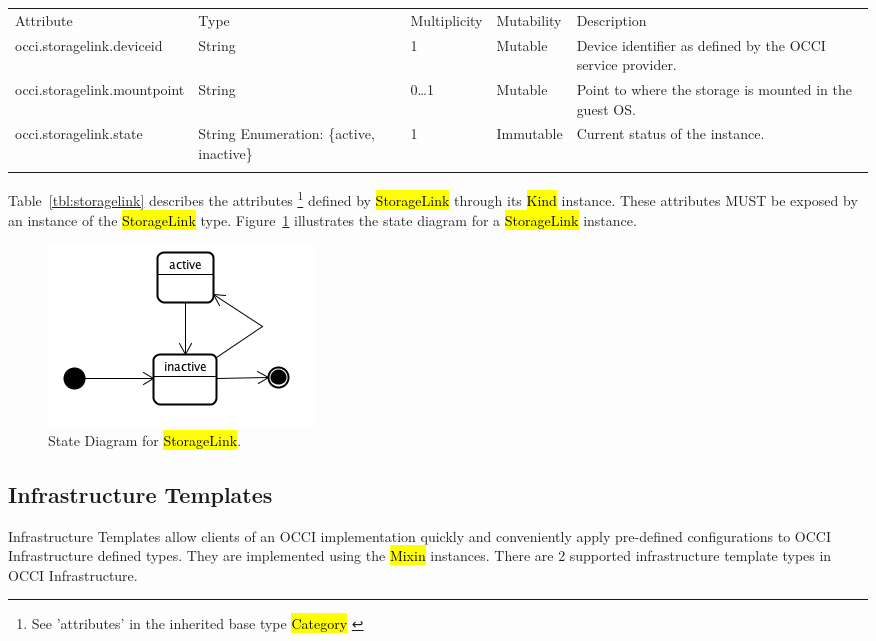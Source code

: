 \documentclass[10pt,a4paper]{article}
\begin{document}
{
	\begin{tabular}{lp{2.5cm}p{1cm}lp{6cm}}
	\toprule
	Attribute&Type&Multi\-plicity&Mutability&Description\\
	\colrule
	occi.storagelink.deviceid & String & 1 & Mutable 
	& Device identifier as defined by the OCCI service provider.\\
	occi.storagelink.mountpoint & String & 0\ldots1 & Mutable 
	& Point to where the storage is mounted in the guest OS.\\
	occi.storagelink.state & String Enumeration: \{active, inactive\}& 1 
	& Immutable & Current status of the instance.\\
	\botrule
	\end{tabular}
}

Table~\ref{tbl:storagelink} describes the attributes \footnote{See ’attributes’ in the inherited 
base type \hl{Category}  \cite{occi:core}} 
defined by \hl{StorageLink} through its \hl{Kind} instance. These attributes
MUST be exposed by an instance of the \hl{StorageLink} type. 
Figure~\ref{fig:storagelink_state} illustrates the state diagram for a \hl{StorageLink} instance.

\begin{figure}[!h]
	\centering
	\includegraphics[scale=0.4]{figs/infra-link-state.png}
	\caption{State Diagram for \hl{StorageLink}.}
	\label{fig:storagelink_state}
\end{figure}

\subsection{Infrastructure Templates}
Infrastructure Templates allow clients of an OCCI implementation quickly and conveniently apply 
pre-defined configurations to OCCI Infrastructure defined types. They are implemented using the 
\hl{Mixin} instances. There are 2 supported infrastructure template types in OCCI Infrastructure.
\end{document}
